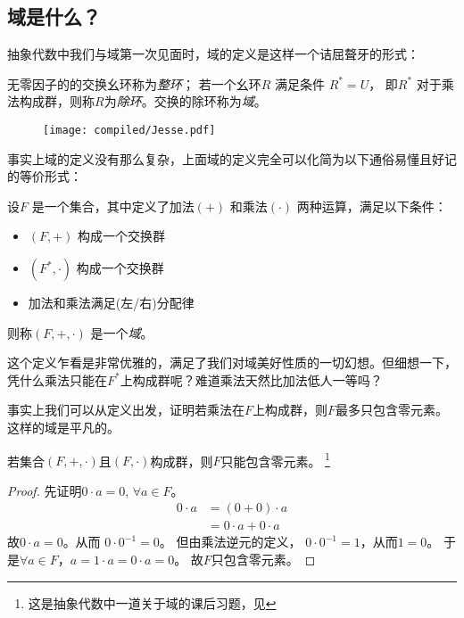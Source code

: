 \subsection{域是什么？}

抽象代数中我们与域第一次见面时，域的定义是这样一个诘屈聱牙的形式：
\begin{definition}
    无零因子的的交换幺环称为\emph{整环}； 若一个幺环\(R\) 满足条件 \(R^{*}=U\)，
    即\(R^{*}\) 对于乘法构成群，则称\(R\)为\emph{除环}。交换的除环称为\emph{域}。
\end{definition}

\begin{figure}[H]
    \centering
    \texttt{[image: compiled/Jesse.pdf]}
\end{figure}
事实上域的定义没有那么复杂，上面域的定义完全可以化简为以下通俗易懂且好记的等价形式：
\begin{definition}
    设\(F\) 是一个集合，其中定义了加法\((+)\) 和乘法\((\cdot)\) 两种运算，满足以下条件：
    \begin{itemize}
        \item \((F, +)\) 构成一个交换群
        \item \((F^{*}, \cdot)\) 构成一个交换群
        \item 加法和乘法满足(左/右)分配律
    \end{itemize}
    则称\((F, +, \cdot)\) 是一个\emph{域}。
\end{definition}

这个定义乍看是非常优雅的，满足了我们对域美好性质的一切幻想。但细想一下，
凭什么乘法只能在\(F^{*}\)上构成群呢？难道乘法天然比加法低人一等吗？

事实上我们可以从定义出发，证明若乘法在\(F\)上构成群，则\(F\)最多只包含零元素。这样的域是平凡的。

\begin{theorem}
    若集合\((F, + ,\cdot)\)且\((F,\cdot)\)构成群，则\(F\)只能包含零元素。
    \footnote{这是抽象代数中一道关于域的课后习题，见}
\end{theorem}
\begin{proof}
    先证明\(0 \cdot a=0\), \(\forall a \in F\)。
    \begin{align*}
        0 \cdot a &= (0+0) \cdot a\\
        &= 0 \cdot a + 0 \cdot a
    \end{align*}
    故\(0 \cdot a=0\)。从而 \(0\cdot 0^{-1}=0\)。
    但由乘法逆元的定义， \(0 \cdot 0^{-1}=1\)，从而\(1=0\)。
    于是\(\forall a \in F\)，\(a=1 \cdot a=0 \cdot a=0\)。
    故\(F\)只包含零元素。
\end{proof}

